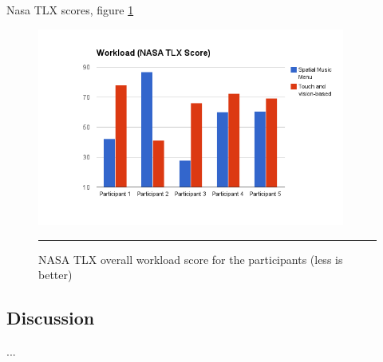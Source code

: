 Nasa TLX scores, figure \ref{fig:resultsnasatlx}

\begin{figure}[htbp]
	\centering
		\includegraphics[width=0.9\textwidth,height=\textheight,keepaspectratio]{./Figures/results_nasatlx.png}
		\rule{35em}{1pt}
	\caption[Results NASA TLX Score]{NASA TLX overall workload score for the participants (less is better)}
	\label{fig:resultsnasatlx}
\end{figure}

\subsection{Discussion}
...





